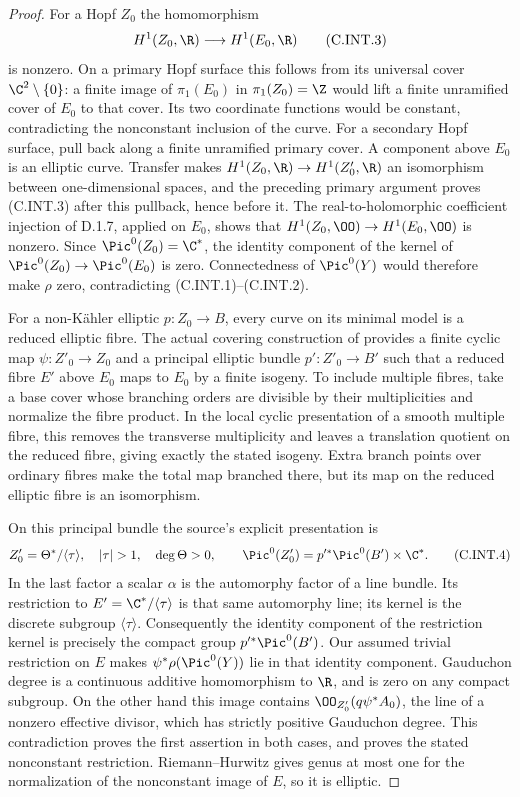 \begin{proof}
For a Hopf $Z_0$ the homomorphism
\[
 H^1(Z_0,\R)\longrightarrow H^1(E_0,\R)
 \tag{C.INT.3}
\]
is nonzero. On a primary Hopf surface this follows from
its universal cover $\C^2\setminus\{0\}$: a finite image
of $\pi_1(E_0)$ in $\pi_1(Z_0)=\Z$ would lift a finite
unramified cover of $E_0$ to that cover. Its two coordinate
functions would be constant, contradicting the nonconstant
inclusion of the curve. For a secondary Hopf surface,
pull back along a finite unramified primary cover. A
component above $E_0$ is an elliptic curve. Transfer makes
$H^1(Z_0,\R)\to H^1(Z'_0,\R)$ an isomorphism between
one-dimensional spaces, and the preceding primary
argument proves (C.INT.3) after this pullback, hence
before it. The real-to-holomorphic coefficient injection
of D.1.7, applied on $E_0$, shows that
$H^1(Z_0,\OO)\to H^1(E_0,\OO)$ is nonzero. Since
$\Pic^0(Z_0)=\C^*$, the identity component of the
kernel of $\Pic^0(Z_0)\to\Pic^0(E_0)$ is zero.
Connectedness of $\Pic^0(Y)$ would therefore make
$\rho$ zero, contradicting (C.INT.1)--(C.INT.2).

For a non-K\"ahler elliptic $p:Z_0\to B$, every curve
on its minimal model is a reduced elliptic fibre.
The actual covering construction of
\cite[Lemma~2.2 and \S2]{BrinzanescuMoraru2005}
provides a finite cyclic map $\psi:Z'_0\to Z_0$ and a
principal elliptic bundle $p':Z'_0\to B'$ such that a
reduced fibre $E'$ above $E_0$ maps to $E_0$ by a finite
isogeny. To include multiple fibres, take a base cover
whose branching orders are divisible by their
multiplicities and normalize the fibre product. In the
local cyclic presentation of a smooth multiple fibre,
this removes the transverse multiplicity and leaves a
translation quotient on the reduced fibre, giving exactly
the stated isogeny. Extra branch points over ordinary
fibres make the total map branched there, but its map on
the reduced elliptic fibre is an isomorphism.

On this principal bundle the source's explicit
presentation is
\[
 Z'_0=\Theta^*/\langle\tau\rangle,
 \quad |\tau|>1,\quad \deg\Theta>0,
 \qquad
 \Pic^0(Z'_0)=p'^*\Pic^0(B')\times\C^*.
 \tag{C.INT.4}
\]
In the last factor a scalar $\alpha$ is the automorphy
factor of a line bundle. Its restriction to
$E'=\C^*/\langle\tau\rangle$ is that same automorphy
line; its kernel is the discrete subgroup
$\langle\tau\rangle$. Consequently the identity
component of the restriction kernel is precisely the
compact group $p'^*\Pic^0(B')$.
Our assumed trivial restriction on $E$ makes
$\psi^*\rho(\Pic^0(Y))$ lie in that identity component.
Gauduchon degree is a continuous additive homomorphism
to $\R$, and is zero on any compact subgroup. On the
other hand this image contains
$\OO_{Z'_0}(q\psi^*A_0)$, the line of a nonzero effective
divisor, which has strictly positive Gauduchon degree.
This contradiction proves the first assertion in both
cases, and proves the stated nonconstant restriction.
Riemann--Hurwitz gives genus at most one for the
normalization of the nonconstant image of $E$, so it is
elliptic.


\end{proof}
